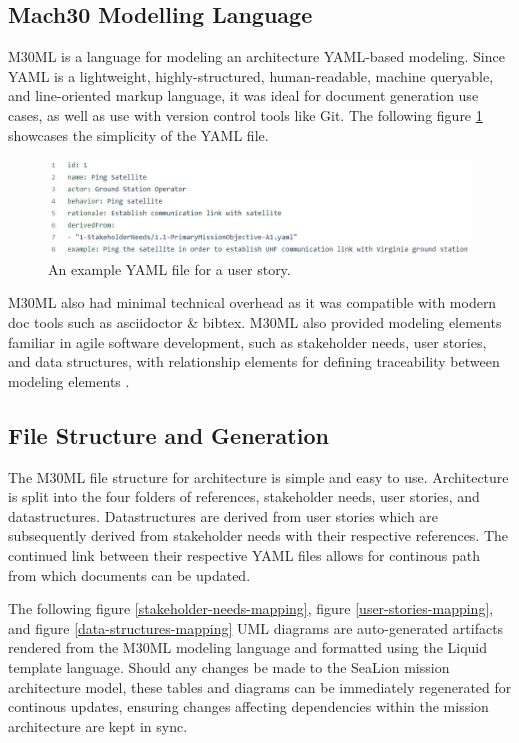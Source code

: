 \documentclass[conf]{new-aiaa}
\begin{document}
\subsection{Mach30 Modelling Language}

M30ML is a language for modeling an architecture YAML-based modeling. Since YAML is a lightweight, highly-structured, human-readable, machine queryable, and line-oriented markup language, it was ideal for document generation use cases, as well as use with version control tools like Git. The following figure \ref{user_story} showcases the simplicity of the YAML file.

\begin{figure}[hbt!]
    \centering
    \includegraphics[width=.5\textwidth]{ping_satellite}
    \caption{An example YAML file for a user story.}
    \label{user_story}
\end{figure}

M30ML also had minimal technical overhead as it was compatible with modern doc tools such as asciidoctor \& bibtex. M30ML also provided modeling elements familiar in agile software development, such as stakeholder needs, user stories, and data structures, with relationship elements for defining traceability between modeling elements \cite{mach30_git}.

\subsection{File Structure and Generation}

The M30ML file structure for architecture is simple and easy to use. Architecture is split into the four folders of references, stakeholder needs, user stories, and datastructures. Datastructures are derived from user stories which are subsequently derived from stakeholder needs with their respective references. The continued link between their respective YAML files allows for continous path from which documents can be updated.

The following figure \ref{stakeholder-needs-mapping}, figure \ref{user-stories-mapping}, and figure \ref{data-structures-mapping} UML diagrams are auto-generated artifacts rendered from the M30ML modeling language and formatted using the Liquid template language. Should any changes be made to the SeaLion mission architecture model, these tables and diagrams can be immediately regenerated for continous updates, ensuring changes affecting dependencies within the mission architecture are kept in sync.
\end{document}
